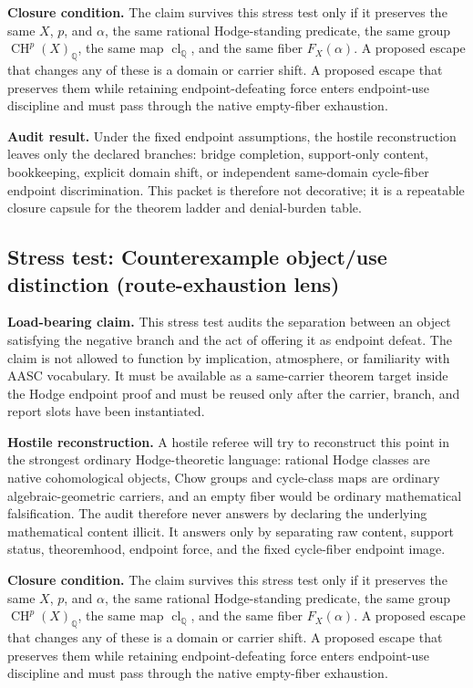 \documentclass[11pt]{article}
\newcommand{\QQ}{\mathbb{Q}}
\newcommand{\CH}{\operatorname{CH}}
\newcommand{\clQ}{\operatorname{cl}_{\QQ}}
\begin{document}
\par\noindent\textbf{Closure condition.} The claim survives this stress test only if it preserves the same $X$, $p$, and $\alpha$, the same rational Hodge-standing predicate, the same group $\CH^p(X)_\QQ$, the same map $\clQ$, and the same fiber $F_X(\alpha)$. A proposed escape that changes any of these is a domain or carrier shift. A proposed escape that preserves them while retaining endpoint-defeating force enters endpoint-use discipline and must pass through the native empty-fiber exhaustion.

\par\noindent\textbf{Audit result.} Under the fixed endpoint assumptions, the hostile reconstruction leaves only the declared branches: bridge completion, support-only content, bookkeeping, explicit domain shift, or independent same-domain cycle-fiber endpoint discrimination. This packet is therefore not decorative; it is a repeatable closure capsule for the theorem ladder and denial-burden table.


\subsection{Stress test: Counterexample object/use distinction (route-exhaustion lens)}

\par\noindent\textbf{Load-bearing claim.} This stress test audits the separation between an object satisfying the negative branch and the act of offering it as endpoint defeat. The claim is not allowed to function by implication, atmosphere, or familiarity with AASC vocabulary. It must be available as a same-carrier theorem target inside the Hodge endpoint proof and must be reused only after the carrier, branch, and report slots have been instantiated.

\par\noindent\textbf{Hostile reconstruction.} A hostile referee will try to reconstruct this point in the strongest ordinary Hodge-theoretic language: rational Hodge classes are native cohomological objects, Chow groups and cycle-class maps are ordinary algebraic-geometric carriers, and an empty fiber would be ordinary mathematical falsification. The audit therefore never answers by declaring the underlying mathematical content illicit. It answers only by separating raw content, support status, theoremhood, endpoint force, and the fixed cycle-fiber endpoint image.

\par\noindent\textbf{Closure condition.} The claim survives this stress test only if it preserves the same $X$, $p$, and $\alpha$, the same rational Hodge-standing predicate, the same group $\CH^p(X)_\QQ$, the same map $\clQ$, and the same fiber $F_X(\alpha)$. A proposed escape that changes any of these is a domain or carrier shift. A proposed escape that preserves them while retaining endpoint-defeating force enters endpoint-use discipline and must pass through the native empty-fiber exhaustion.
\end{document}
